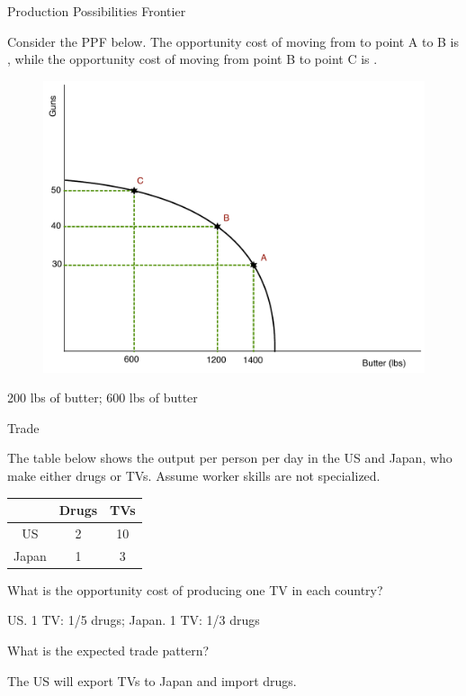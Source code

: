 \documentclass[pdf, handout]{beamer}
\begin{document}
\begin{frame}{Production Possibilities Frontier}

Consider the PPF below. The opportunity cost of moving from to point A to B is \underline{\hspace{2cm}}, while the opportunity cost of moving from point B to point C is \underline{\hspace{2cm}}.

\begin{figure}[H]
	\centering
	\includegraphics[scale=.25]{Exam_Review2.pdf}
\end{figure}

\pause
\begin{flushright}
	\color{red} 200 lbs of butter; 600 lbs of butter
\end{flushright}

\end{frame}

\begin{frame}{Trade}
	
The table below shows the output per person per day in the US and Japan, who make either drugs or TVs. Assume worker skills are not specialized. 

\begin{table}
	\begin{tabular}{c| c |c }
		 & Drugs & TVs  \\
		\hline 
		US & 2 & 10 \\ 
		Japan & 1 & 3 \\
	\end{tabular}
\end{table}

What is the opportunity cost of producing one TV in each country?

\pause
\begin{flushright}
	\color{red} US. 1 TV: 1/5 drugs; Japan. 1 TV: 1/3 drugs
\end{flushright}

\pause 
What is the expected trade pattern? 
\pause
\begin{flushright}
	\color{red} The US will export TVs to Japan and import drugs.
\end{flushright}

\end{frame}
\end{document}
